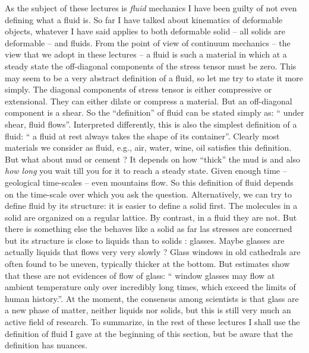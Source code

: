 \documentclass{tufte-book} %
\begin{document}
As the subject of these lectures is \textit{fluid} mechanics I have been
guilty of not even defining what a fluid is. So far I have talked about
kinematics of deformable objects, whatever I have said applies to both
deformable solid -- all solids are deformable -- and fluids. From the
point of view of continuum mechanics -- the view that we adopt in
these lectures -- a fluid is such a material in which at a steady
state the off-diagonal components of the stress tensor must be
zero. This may seem to be a very abstract definition of a fluid, so
let me try to state it more simply. The diagonal components of stress
tensor is  either compressive or extensional. They can either dilate or
compress a material. But an off-diagonal component is a shear.
So the ``definition'' of fluid can be stated simply as: `` under shear,
fluid flows''. Interpreted differently, this is also the simplest
definition of a fluid: `` a fluid at rest always takes the shape of
its container''.  Clearly most materials we consider as fluid, e.g.,  air,
water, wine, oil satisfies this definition. But what about mud or
cement ? It depends on how ``thick'' the mud is and also \textit{ how
  long} you wait till you for it to reach a steady state. Given enough
time -- geological time-scales -- even mountains flow. 
So this definition of fluid depends on the time-scale over which you ask
the question.  Alternatively, we can try to define fluid by its
structure: it is easier to define a solid first. The molecules in a
solid are organized on a regular lattice. By contrast, in a fluid they
are not. But there is something else the behaves like a solid as far
las stresses are concerned but its structure is close to liquids than
to solids : glasses.  Maybe glasses are actually liquids that flows
very very slowly ? Glass windows in old cathedrals are often found to
be uneven, typically thicker at the bottom. But estimates show that 
these are not evidences of flow of glass: `` window glasses may flow 
at ambient temperature only over incredibly long times, 
which exceed the limits of human
history.''\cite{zanotto1998cathedral,zanotto1999cathedral}. 
At the moment, the consensus among scientists is that glass are a
new phase of matter, neither liquids nor solids, but this is still
very much an active field of research. 
To summarize, in the rest of these lectures I shall use the definition of fluid I gave at the
beginning of this section, but be aware that the definition has
nuances. 
\end{document}
